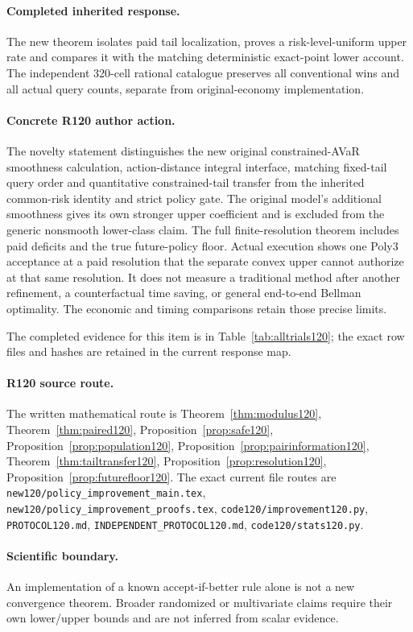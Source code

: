 \paragraph{Completed inherited response.}
The new theorem isolates paid tail localization, proves a risk-level-uniform upper rate and compares it with the matching deterministic exact-point lower account. The independent 320-cell rational catalogue preserves all conventional wins and all actual query counts, separate from original-economy implementation.
\paragraph{Concrete R120 author action.}
The novelty statement distinguishes the new original constrained-AVaR smoothness calculation, action-distance integral interface, matching fixed-tail query order and quantitative constrained-tail transfer from the inherited common-risk identity and strict policy gate. The original model's additional smoothness gives its own stronger upper coefficient and is excluded from the generic nonsmooth lower-class claim. The full finite-resolution theorem includes paid deficits and the true future-policy floor. Actual execution shows one Poly3 acceptance at a paid resolution that the separate convex upper cannot authorize at that same resolution. It does not measure a traditional method after another refinement, a counterfactual time saving, or general end-to-end Bellman optimality. The economic and timing comparisons retain those precise limits.

The completed evidence for this item is in Table~\ref{tab:alltrials120}; the exact row files and hashes are retained in the current response map.
\paragraph{R120 source route.}
The written mathematical route is Theorem~\ref{thm:modulus120}, Theorem~\ref{thm:paired120}, Proposition~\ref{prop:safe120}, Proposition~\ref{prop:population120}, Proposition~\ref{prop:pairinformation120}, Theorem~\ref{thm:tailtransfer120}, Proposition~\ref{prop:resolution120}, Proposition~\ref{prop:futurefloor120}. The exact current file routes are \nolinkurl{new120/policy_improvement_main.tex}, \nolinkurl{new120/policy_improvement_proofs.tex}, \nolinkurl{code120/improvement120.py}, \nolinkurl{PROTOCOL120.md}, \nolinkurl{INDEPENDENT_PROTOCOL120.md}, \nolinkurl{code120/stats120.py}.
\paragraph{Scientific boundary.}
An implementation of a known accept-if-better rule alone is not a new convergence theorem. Broader randomized or multivariate claims require their own lower/upper bounds and are not inferred from scalar evidence.

